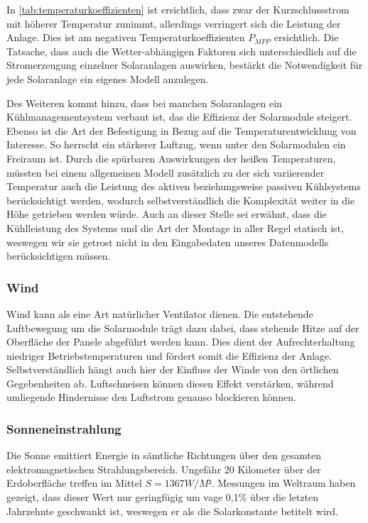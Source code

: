 \documentclass[12pt, a4paper]{article}
\begin{document}

In \autoref{tab:temperaturkoeffizienten} ist ersichtlich, dass zwar der Kurzschlussstrom mit höherer Temperatur zunimmt, allerdings verringert sich die Leistung der Anlage. Dies ist am negativen Temperaturkoeffizienten $P_{MPP}$ ersichtlich. Die Tatsache, dass auch die Wetter-abhängigen Faktoren sich unterschiedlich auf die Stromerzeugung einzelner Solaranlagen auswirken, bestärkt die Notwendigkeit für jede Solaranlage ein eigenes Modell anzulegen.

Des Weiteren kommt hinzu, dass bei manchen Solaranlagen ein Kühlmanagementsystem verbaut ist, das die Effizienz der Solarmodule steigert. Ebenso ist die Art der Befestigung in Bezug auf die Temperaturentwicklung von Interesse. So herrscht ein stärkerer Luftzug, wenn unter den Solarmodulen ein Freiraum ist. Durch die spürbaren Auswirkungen der heißen Temperaturen, müssten bei einem allgemeinen Modell zusätzlich zu der sich variierender Temperatur auch die Leistung des aktiven beziehungsweise passiven Kühlsystems berücksichtigt werden, wodurch selbstverständlich die Komplexität weiter in die Höhe getrieben werden würde. Auch an dieser Stelle sei erwähnt, dass die Kühlleistung des Systems und die Art der Montage in aller Regel statisch ist, weswegen wir sie getrost nicht in den Eingabedaten unseres Datenmodells berücksichtigen müssen.

\subsubsection{Wind}

Wind kann als eine Art natürlicher Ventilator dienen. Die entstehende Luftbewegung um die Solarmodule trägt dazu dabei, dass stehende Hitze auf der Oberfläche der Panele abgeführt werden kann. Dies dient der Aufrechterhaltung niedriger Betriebstemperaturen und fördert somit die Effizienz der Anlage. Selbstverständlich hängt auch hier der Einfluss der Winde von den örtlichen Gegebenheiten ab. Luftschneisen können diesen Effekt verstärken, während umliegende Hindernisse den Luftstrom genauso blockieren können.

\subsubsection{Sonneneinstrahlung}

Die Sonne emittiert Energie in sämtliche Richtungen über den gesamten elektromagnetischen Strahlungsbereich. Ungefähr 20 Kilometer über der Erdoberfläche treffen im Mittel $S = 1367 W/M²$. Messungen im Weltraum haben gezeigt, dass dieser Wert nur geringfügig um vage 0,1\% über die letzten Jahrzehnte geschwankt ist, weswegen er als die Solarkonstante betitelt wird. 
\end{document}
